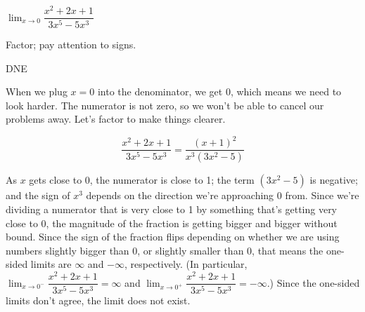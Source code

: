 \begin{question}
$\displaystyle\lim_{x \rightarrow 0} \dfrac{x^2+2x+1}{3x^5-5x^3}$
\end{question}
\begin{hint} Factor; pay attention to signs.
\end{hint}
\begin{answer} DNE
\end{answer}
\begin{solution} When we plug $x=0$ into the denominator, we get 0, which means we need to look harder. The numerator is not zero, so we won't be able to cancel our problems away. Let's factor to make things clearer.

\[\dfrac{x^2+2x+1}{3x^5-5x^3} =
\dfrac{(x+1)^2}{x^3(3x^2-5)}\]

As $x$ gets close to 0, the numerator is close to 1; the term $(3x^2-5)$ is negative; and the sign of $x^3$ depends on the direction we're approaching 0 from. Since we're  dividing a numerator that is very close to 1 by something that's getting very close to 0, the magnitude of the fraction is getting bigger and bigger without bound. Since the sign of the fraction flips depending on whether we are using numbers slightly bigger than 0, or slightly smaller than 0, that means the one-sided limits are $\infty$ and $-\infty$, respectively.
(In particular, $\displaystyle\lim_{x \rightarrow 0^-}\dfrac{x^2+2x+1}{3x^5-5x^3}=\infty
$ and $\displaystyle\lim_{x \rightarrow 0^+}\dfrac{x^2+2x+1}{3x^5-5x^3}=-\infty
$.) Since the one-sided limits don't agree, the limit does not exist.
\end{solution}

